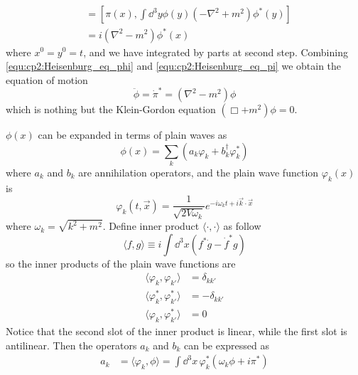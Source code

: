\begin{problembody}
\begin{align}
        & = \left[\pi(x), \int \dd^3y \phi(y)(-\nabla^2 + m^2)\phi^\ast(y)\right]\nonumber\\
        & = i(\nabla^2 - m^2) \phi^\ast(x)
    \end{align}
    where $x^0 = y^0 = t$, and we have integrated by parts at second step. Combining \eqref{equ:cp2:Heisenburg_eq_phi} 
    and \eqref{equ:cp2:Heisenburg_eq_pi} we obtain the equation of motion
    \begin{equation}\label{equ:cp2:csf_equation_of_motion}
        \ddot{\phi} = \dot{\pi}^\ast = (\nabla^2 - m^2)\phi
    \end{equation}
    which is nothing but the Klein-Gordon equation $(\Box + m^2)\phi = 0$.

    \item $\phi(x)$ can be expanded in terms of plain waves as
    \begin{equation}\label{equ:cp2:phi_expand}
        \phi(x) = \sum_k \left(a_k \varphi_k + b^\dagger_k \varphi^\ast_k \right)
    \end{equation}
    where $a_k$ and $b_k$ are annihilation operators, and the plain wave function $\varphi_k(x)$ is 
    \begin{equation}\label{equ:cp2:plain_w}
        \varphi_k(t, \vec{x}) = \frac{1}{\sqrt{2V\omega_k}}e^{-i\omega_kt + i\vec{k}\cdot\vec{x}}
    \end{equation}
    where $\omega_k = \sqrt{k^2 + m^2}$. Define inner product $\langle\cdot,\cdot\rangle$ as follow
    \begin{equation}\label{equ:cp2:inner_prod}
        \langle f, g \rangle \equiv i \int \dd^3x (f^\ast\dot{g} - \dot{f}^\ast g)
    \end{equation}
    so the inner products of the plain wave functions are
    \begin{align*}
        \langle \varphi_k, \varphi_{k'} \rangle & = \delta_{kk'}\\
        \langle \varphi^\ast_k, \varphi^\ast_{k'} \rangle & = -\delta_{kk'}\\
        \langle \varphi_k, \varphi^\ast_{k'} \rangle & = 0
    \end{align*}
    Notice that the second slot of the inner product is linear, while the first slot is antilinear. 
    Then the operators $a_k$ and $b_k$ can be expressed as
    \begin{subequations}\label{equ:cp2:csf_optr_a_b}
        \begin{align}
            a_k & = \langle \varphi_k, \phi \rangle = \int \dd^3x \, \varphi^\ast_k \left(\omega_k\phi + i\pi^\ast\right)\\

\end{align}
\end{subequations}
\end{problembody}
